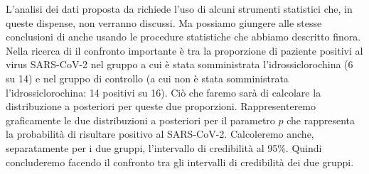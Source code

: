 L'analisi dei dati proposta da \citet{Hulme_2020} richiede l'uso di alcuni strumenti statistici che, in queste dispense, non verranno discussi.  
Ma possiamo giungere alle stesse conclusioni di \citet{Hulme_2020} anche usando le procedure statistiche che abbiamo descritto finora.
Nella ricerca di \citet{Gautret_2020} il confronto importante è tra la proporzione di paziente positivi al virus SARS-CoV-2 nel gruppo a cui è stata somministrata l'idrossiclorochina (6 su 14) e nel gruppo di controllo (a cui non è stata somministrata l'idrossiclorochina: 14 positivi su 16). 
Ciò che faremo sarà di calcolare la distribuzione a posteriori per queste due proporzioni.
Rappresenteremo graficamente le due distribuzioni a posteriori per il parametro $p$ che rappresenta la probabilità di risultare positivo al SARS-CoV-2.
Calcoleremo anche, separatamente per i due gruppi, l'intervallo di credibilità al 95\%.
Quindi concluderemo facendo il confronto tra gli intervalli di credibilità dei due gruppi.

